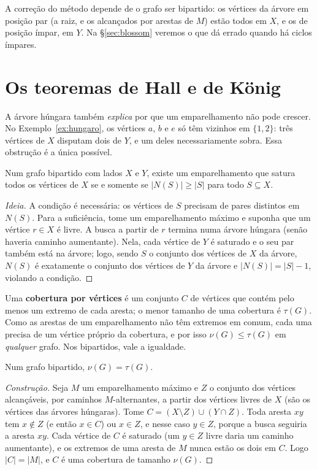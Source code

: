 A correção do método depende de o grafo ser bipartido: os vértices da árvore em posição par (a raiz, e os alcançados por arestas de $M$) estão todos em $X$, e os de posição ímpar, em $Y$. Na §\ref{sec:blossom} veremos o que dá errado quando há ciclos ímpares.

\section{Os teoremas de Hall e de König}\label{sec:konig}
A árvore húngara também \emph{explica} por que um emparelhamento não pode crescer. No Exemplo~\ref{ex:hungaro}, os vértices $a$, $b$ e $e$ só têm vizinhos em $\{1,2\}$: três vértices de $X$ disputam dois de $Y$, e um deles necessariamente sobra. Essa obstrução é a única possível.

\begin{teo}[Hall]\label{teo:hall}
Num grafo bipartido com lados $X$ e $Y$, existe um emparelhamento que satura todos os vértices de $X$ se e somente se $|N(S)|\ge|S|$ para todo $S\subseteq X$.
\end{teo}
\begin{proof}[Ideia]
A condição é necessária: os vértices de $S$ precisam de pares distintos em $N(S)$. Para a suficiência, tome um emparelhamento máximo e suponha que um vértice $r\in X$ é livre. A busca a partir de $r$ termina numa árvore húngara (senão haveria caminho aumentante). Nela, cada vértice de $Y$ é saturado e o seu par também está na árvore; logo, sendo $S$ o conjunto dos vértices de $X$ da árvore, $N(S)$ é exatamente o conjunto dos vértices de $Y$ da árvore e $|N(S)|=|S|-1$, violando a condição.
\end{proof}

Uma \textbf{cobertura por vértices} é um conjunto $C$ de vértices que contém pelo menos um extremo de cada aresta; o menor tamanho de uma cobertura é $\tau(G)$. Como as arestas de um emparelhamento não têm extremos em comum, cada uma precisa de um vértice próprio da cobertura, e por isso $\nu(G)\le\tau(G)$ em \emph{qualquer} grafo. Nos bipartidos, vale a igualdade.
\begin{teo}[König]\label{teo:konig}
Num grafo bipartido, $\nu(G)=\tau(G)$.
\end{teo}
\begin{proof}[Construção]
Seja $M$ um emparelhamento máximo e $Z$ o conjunto dos vértices alcançáveis, por caminhos $M$-alternantes, a partir dos vértices livres de $X$ (são os vértices das árvores húngaras). Tome $C=(X\setminus Z)\cup(Y\cap Z)$. Toda aresta $xy$ tem $x\notin Z$ (e então $x\in C$) ou $x\in Z$, e nesse caso $y\in Z$, porque a busca seguiria a aresta $xy$. Cada vértice de $C$ é saturado (um $y\in Z$ livre daria um caminho aumentante), e os extremos de uma aresta de $M$ nunca estão os dois em $C$. Logo $|C|=|M|$, e $C$ é uma cobertura de tamanho $\nu(G)$.
\end{proof}


